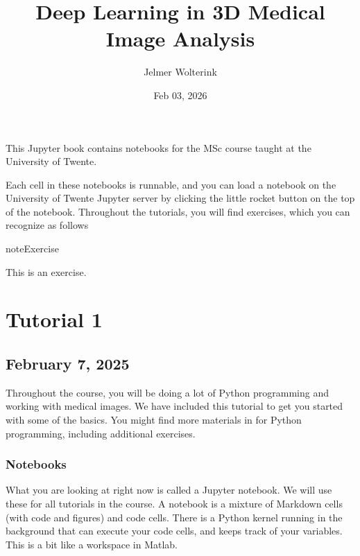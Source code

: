 \documentclass[letterpaper,10pt,english]{jupyterBook}
\title{Deep Learning in 3D Medical Image Analysis}
\date{Feb 03, 2026}
\author{Jelmer Wolterink}
\begin{document}
\pagestyle{empty}
\sphinxmaketitle
\pagestyle{plain}
\sphinxtableofcontents
\pagestyle{normal}
\label{\detokenize{index::doc}}


\sphinxAtStartPar
This Jupyter book contains notebooks for the MSc course  taught at the University of Twente.

\sphinxAtStartPar
Each cell in these notebooks is runnable, and you can load a notebook on the University of Twente Jupyter server by clicking the little rocket button on the top of the notebook. Throughout the tutorials, you will find exercises, which you can recognize as follows

\begin{sphinxadmonition}{note}{Exercise}

\sphinxAtStartPar
This is an exercise.
\end{sphinxadmonition}

\sphinxstepscope


\chapter{Tutorial 1}
\label{\detokenize{notebooks/Tutorial1_NumpySimpleITK/Tutorial1_NumpySimpleITK_student:tutorial-1}}\label{\detokenize{notebooks/Tutorial1_NumpySimpleITK/Tutorial1_NumpySimpleITK_student::doc}}

\section{February 7, 2025}
\label{\detokenize{notebooks/Tutorial1_NumpySimpleITK/Tutorial1_NumpySimpleITK_student:february-7-2025}}
\sphinxAtStartPar
Throughout the course, you will be doing a lot of Python programming and working with medical images.  We have included this tutorial to get you started with some of the basics. You might find more materials in  for Python programming, including additional exercises.


\subsection{Notebooks}
\label{\detokenize{notebooks/Tutorial1_NumpySimpleITK/Tutorial1_NumpySimpleITK_student:notebooks}}
\sphinxAtStartPar
What you are looking at right now is called a Jupyter notebook. We will use these for all tutorials in the course. A notebook is a mixture of Markdown cells (with code and figures) and code cells. There is a Python kernel running in the background that can execute your code cells, and keeps track of your variables. This is a bit like a workspace in Matlab.
\end{document}
